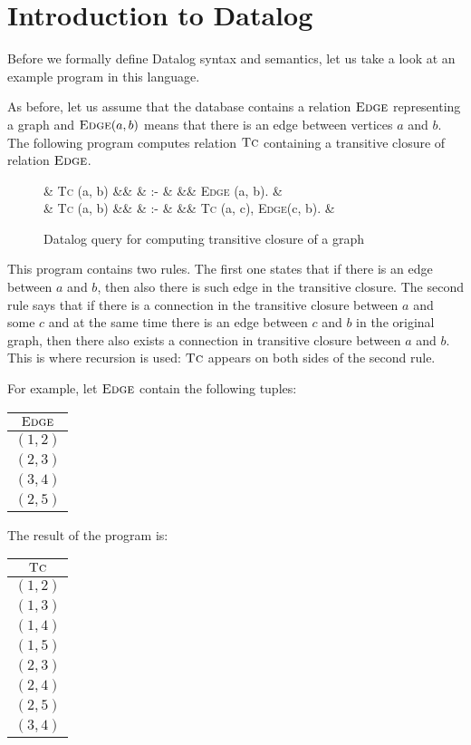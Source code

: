\documentclass{pracamgr}
\theoremstyle{plain}
\theoremstyle{definition}
\theoremstyle{remark}
\newenvironment{centab}[1]{\begin{center}\begin{tabular}{#1}}{\end{tabular}\end{center}}
\newcommand{\narrow}[1]{\begin{changemargin}{2cm}{2cm} #1 \end{changemargin}}
\newcommand{\dprog}[4]{
  \begin{figure}[h!]
    \narrow{
      #1
      \begin{flalign*}
      #2
      \end{flalign*}
      \caption{#3}
      \label{#4}
  }
\end{figure}

}
\begin{document}
\section{Introduction to Datalog}

Before we formally define Datalog syntax and semantics, let us take a look at an example program in this language.

As before, let us assume that the database contains a relation $\textsc{Edge}$ representing a graph and $\textsc{Edge}(a, b)$ means that there is an edge between vertices $a$ and $b$. The following program computes relation $\textsc{Tc}$ containing a transitive closure of relation $\textsc{Edge}$.

\dprog{}{
  & \textsc{Tc} (a, b) &&  & :- & && \textsc{Edge} (a, b). & \\
  & \textsc{Tc} (a, b) &&  & :- & && \textsc{Tc} (a, c), \textsc{Edge}(c, b). &\\
}{Datalog query for computing transitive closure of a graph}{ex:tcdatalog}

This program contains two rules. The first one states that if there is an edge between $a$ and $b$, then also there is such edge in the transitive closure. The second rule says that if there is a connection in the transitive closure between $a$ and some $c$ and at the same time there is an edge between $c$ and $b$ in the original graph, then there also exists a connection in transitive closure between $a$ and $b$. This is where recursion is used: $\textsc{Tc}$ appears on both sides of the second rule.

For example, let $\textsc{Edge}$ contain the following tuples:

\begin{centab}{ | c | }
  \hline
  $\textsc{Edge}$ \\
  \hline
  $(1, 2)$ \\
  $(2, 3)$ \\
  $(3, 4)$ \\
  $(2, 5)$ \\
  \hline
\end{centab}

The result of the program is:

\begin{centab}{ | c | }
  \hline
  $\textsc{Tc}$ \\
  \hline
  $(1, 2)$ \\
  $(1, 3)$ \\
  $(1, 4)$ \\
  $(1, 5)$ \\
  $(2, 3)$ \\
  $(2, 4)$ \\
  $(2, 5)$ \\
  $(3, 4)$ \\
  \hline
\end{centab}
\end{document}
